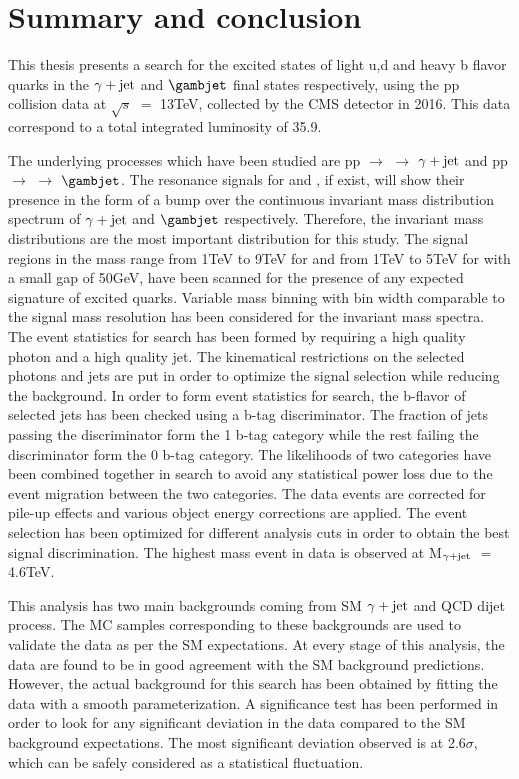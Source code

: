 \chapter{Summary and conclusion}
This thesis presents a search for the excited states of light u,d and heavy b flavor quarks in the $\gamma+\mathrm{jet}$ and $\gambjet$ final states respectively, using the
pp collision data at $\sqrt{s}$ $=$ 13\unit{TeV}, collected by the CMS detector in 2016. This data correspond to a total integrated luminosity of
35.9\unit{\fbinv}.

The underlying processes which have been studied are pp $\rightarrow$ \qstar $\rightarrow$ $\gamma+\mathrm{jet}$ and
pp $\rightarrow$ \bstar $\rightarrow$ $\gambjet$. The resonance signals for \qstar and \bstar, if exist, will show their presence in the form of a bump
over the continuous invariant mass distribution spectrum of $\gamma+\mathrm{jet}$ and $\gambjet$ respectively. Therefore, the invariant mass distributions are the
most important distribution for this study. The signal regions in the mass range from 1\unit{TeV} to 9\unit{TeV} for \qstar and from 1\unit{TeV}
to 5\unit{TeV} for \bstar with a small gap of 50\unit{GeV}, have been scanned for the presence of any expected signature of excited quarks. Variable mass binning with
bin width comparable to the signal mass resolution has been considered for the invariant mass spectra. The event statistics for \qstar
search has been formed by requiring a high quality photon and a high quality jet.
The kinematical restrictions on the selected photons and jets are put in order to optimize the signal selection while reducing the background. In order to form event
statistics for \bstar search, the b-flavor of selected jets has been checked using a b-tag discriminator. The fraction of jets passing the discriminator form
the 1 b-tag category while the rest failing the discriminator form the 0 b-tag category. The likelihoods of two categories have been combined together in \bstar
search to avoid any statistical power loss due to the event migration between the two categories. The data events are corrected for pile-up effects and
various object energy corrections are applied. The event selection has been optimized for different analysis cuts in order to obtain the best signal
discrimination. The highest mass event in data is observed at M$_{\gamma+\mathrm{jet}}$ $=$ 4.6\unit{TeV}. 

This analysis has two main backgrounds coming from SM $\gamma+\mathrm{jet}$ and QCD dijet process. The MC samples corresponding to these backgrounds are used to validate
the data as per the SM expectations. At every stage of this analysis, the data are found to be in good agreement with the SM background predictions.  
However, the actual background for this search has been obtained by fitting the data with a smooth parameterization.
A significance test has been performed in order to look for any significant deviation in the data compared to the SM background expectations.
The most significant deviation observed is at 2.6$\sigma$, which can be safely considered as a statistical fluctuation. 


